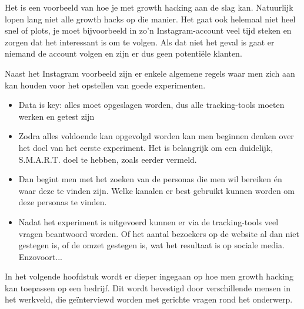 Het is een voorbeeld van hoe je met growth hacking aan de slag kan. Natuurlijk lopen lang niet alle growth hacks op die manier. Het gaat ook helemaal niet heel snel of plots, je moet bijvoorbeeld in zo'n Instagram-account veel tijd steken en zorgen dat het interessant is om te volgen. Als dat niet het geval is gaat er niemand de account volgen en zijn er dus geen potentiële klanten.

Naast het Instagram voorbeeld zijn er enkele algemene regels waar men zich aan kan houden voor het opstellen van goede experimenten. 

\begin{itemize}
	\item Data is key: alles moet opgeslagen worden, dus alle tracking-tools moeten werken en getest zijn
	\item Zodra alles voldoende kan opgevolgd worden kan men beginnen denken over het doel van het eerste experiment. Het is belangrijk om een duidelijk, S.M.A.R.T. doel te hebben, zoals eerder vermeld.
	\item Dan begint men met het zoeken van de personas die men wil bereiken én waar deze te vinden zijn. Welke kanalen er best gebruikt kunnen worden om deze personas te vinden.
	\item Nadat het experiment is uitgevoerd kunnen er via de tracking-tools veel vragen beantwoord worden. Of het aantal bezoekers op de website al dan niet gestegen is, of de omzet gestegen is, wat het resultaat is op sociale media. Enzovoort... 
\end{itemize}

In het volgende hoofdstuk wordt er dieper ingegaan op hoe men growth hacking kan toepassen op een bedrijf. Dit wordt bevestigd door verschillende mensen in het werkveld, die geïnterviewd worden met gerichte vragen rond het onderwerp.


